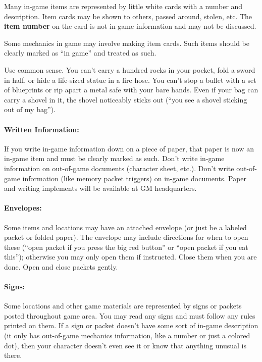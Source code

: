 \documentclass[sheet]{GL2020}
\begin{document}
Many in-game items are represented by little white cards with a number and description.  Item cards may be shown to others, passed around, stolen, etc.  The {\bf item number} on the card is not in-game information and may not be discussed.  

Some mechanics in game may involve making item cards. Such items should be clearly marked as ``in game'' and treated as such.

Use common sense.  You can't carry a hundred rocks in your pocket, fold a sword in half, or hide a life-sized statue in a fire hose.  You can't stop a bullet with a set of blueprints or rip apart a metal safe with your bare hands.  Even if your bag can carry a shovel in it, the shovel noticeably sticks out (``you see a shovel sticking out of my bag'').

\paragraph{Written Information:} If you write in-game information down on a piece of paper, that paper is now an in-game item and must be clearly marked as such.  Don't write in-game information on out-of-game documents (character sheet, etc.).  Don't write out-of-game information (like memory packet triggers) on in-game documents. Paper and writing implements will be available at GM headquarters.

\paragraph{Envelopes:} Some items and locations may have an attached envelope (or just be a labeled packet or folded paper).  The envelope may include directions for when to open these (``open packet if you press the big red button'' or ``open packet if you eat this''); otherwise you may only open them if instructed.  Close them when you are done.  Open and close packets gently.

\paragraph{Signs:} Some locations and other game materials are represented by signs or packets posted throughout game area.  You may read any signs and must follow any rules printed on them.  If a sign or packet doesn't have some sort of in-game description (it only has out-of-game mechanics information, like a number or just a colored dot), then your character doesn't even see it or know that anything unusual is there.
\end{document}
